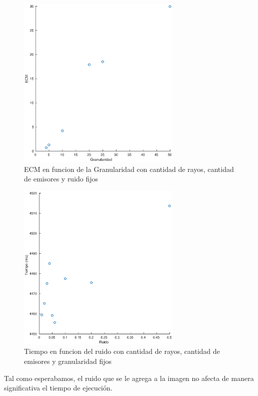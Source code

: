 \begin{figure}[H]
	\centering	\includegraphics[width=0.7\textwidth]{img/granu_ecm}
	\caption{ECM en funcion de la Granularidad con cantidad de rayos, cantidad de emisores y ruido fijos}
	\label{fig:granu_ecm}
\end{figure}

\begin{figure}[H]
	\centering	\includegraphics[width=0.7\textwidth]{img/ruido_tiempo}
	\caption{Tiempo en funcion del ruido con cantidad de rayos, cantidad de emisores y granularidad fijos}
	\label{fig:ruido_tiempo}
\end{figure}

\par Tal como esperabamos, el ruido que se le agrega a la imagen no afecta de manera significativa el tiempo de ejecuci\'on.

